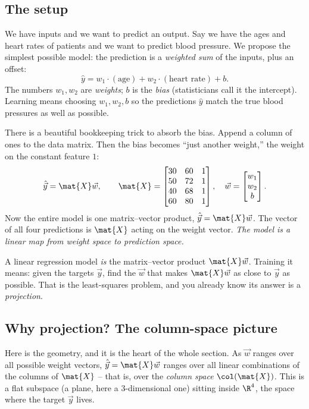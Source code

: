 \subsection{The setup}

We have inputs and we want to predict an output. Say we have the ages and heart rates of
patients and we want to predict blood pressure. We propose the simplest possible model:
the prediction is a \emph{weighted sum} of the inputs, plus an offset:
\[
\hat{y} = w_1 \cdot (\text{age}) + w_2 \cdot (\text{heart rate}) + b.
\]
The numbers $w_1, w_2$ are \emph{weights}; $b$ is the \emph{bias} (statisticians call it
the intercept). Learning means choosing $w_1, w_2, b$ so the predictions $\hat{y}$ match
the true blood pressures as well as possible.

There is a beautiful bookkeeping trick to absorb the bias. Append a column of ones to the
data matrix. Then the bias becomes ``just another weight,'' the weight on the constant
feature $1$:
\[
\hat{\vec{y}} = \mat{X}\vec{w}, \qquad
\mat{X} =
\begin{bmatrix}
30 & 60 & 1 \\
50 & 72 & 1 \\
40 & 68 & 1 \\
60 & 80 & 1
\end{bmatrix},
\quad
\vec{w} = \begin{bmatrix} w_1 \\ w_2 \\ b \end{bmatrix}.
\]
Now the entire model is one matrix--vector product, $\hat{\vec{y}} = \mat{X}\vec{w}$. The
vector of all four predictions is $\mat{X}$ acting on the weight vector. \emph{The model
is a linear map from weight space to prediction space.}

\begin{focusbox}
A linear regression model \emph{is} the matrix--vector product $\mat{X}\vec{w}$. Training
it means: given the targets $\vec{y}$, find the $\vec{w}$ that makes $\mat{X}\vec{w}$ as
close to $\vec{y}$ as possible. That is the least-squares problem, and you already know
its answer is a \emph{projection}.
\end{focusbox}

\subsection{Why projection? The column-space picture}

Here is the geometry, and it is the heart of the whole section. As $\vec{w}$ ranges over
all possible weight vectors, $\hat{\vec{y}} = \mat{X}\vec{w}$ ranges over all linear
combinations of the columns of $\mat{X}$ -- that is, over the \emph{column space}
$\col(\mat{X})$. This is a flat subspace (a plane, here a 3-dimensional one) sitting
inside $\R^{4}$, the space where the target $\vec{y}$ lives.

